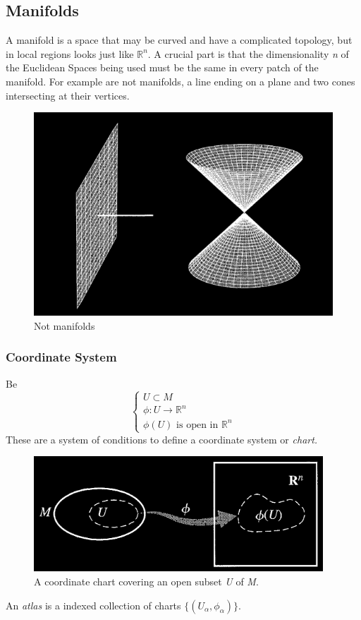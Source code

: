 \subsection{Manifolds}
A manifold is a space that may be curved and have a complicated topology, but in local regions looks just like $\mathbb{R}^{n}$. A crucial part is that the dimensionality \emph{n} of the Euclidean Spaces being used must be the same in every patch of the manifold.
For example are not manifolds, a line ending on a plane and two cones intersecting at their vertices.\par
\begin{figure}[h]
\centering
\includegraphics[width=0.5\linewidth]{imm/notmanifold.png}
\caption{Not manifolds}
\label{imm:notmanifold.png}
\end{figure}

\subsubsection{Coordinate System}
Be 
\begin{equation}
\begin{cases}
U\subset M \\
\phi : U \to \mathbb{R}^{n} \\
\phi\left( U \right) \text{ is open in }\mathbb{R}^{n}
\end{cases}
\end{equation}
These are a system of conditions to define a coordinate system or \emph{chart.}\par
\begin{figure}[h]
\centering
\includegraphics[width=0.65\linewidth]{imm/chart.png}
\caption{A coordinate chart covering an open subset \emph{U} of \emph{M}.}
\label{imm:chart}
\end{figure}
An \emph{atlas} is a indexed collection of charts $\{\left( U_{\alpha}, \phi_{\alpha } \right)\}$.

